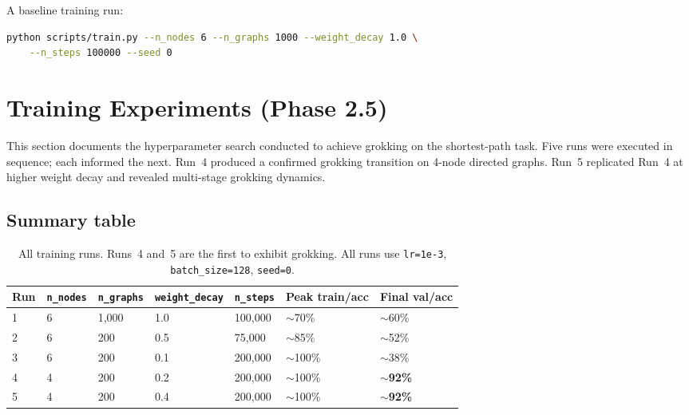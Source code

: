 \documentclass[11pt, a4paper]{article}
\begin{document}
A baseline training run:
\begin{lstlisting}[language=bash, keywordstyle={}]
python scripts/train.py --n_nodes 6 --n_graphs 1000 --weight_decay 1.0 \
    --n_steps 100000 --seed 0
\end{lstlisting}

\section{Training Experiments (Phase 2.5)}
\label{sec:experiments}

This section documents the hyperparameter search conducted to achieve grokking
on the shortest-path task. Five runs were executed in sequence; each informed
the next. Run~4 produced a confirmed grokking transition on 4-node directed
graphs. Run~5 replicated Run~4 at higher weight decay and revealed multi-stage
grokking dynamics.

\subsection{Summary table}

\begin{table}[H]
\centering
\begin{tabular}{@{}lllllll@{}}
\toprule
Run & \texttt{n\_nodes} & \texttt{n\_graphs} & \texttt{weight\_decay} & \texttt{n\_steps}
    & Peak train/acc & Final val/acc \\
\midrule
1 & 6 & 1{,}000 & 1.0  & 100{,}000 & $\sim$70\%  & $\sim$60\% \\
2 & 6 & 200     & 0.5  & 75{,}000  & $\sim$85\%  & $\sim$52\% \\
3 & 6 & 200     & 0.1  & 200{,}000 & $\sim$100\% & $\sim$38\% \\
4 & 4 & 200     & 0.2  & 200{,}000 & $\sim$100\% & $\sim$\textbf{92\%} \\
5 & 4 & 200     & 0.4  & 200{,}000 & $\sim$100\% & $\sim$\textbf{92\%} \\
\bottomrule
\end{tabular}
\caption{All training runs. Runs~4 and~5 are the first to exhibit grokking.
  All runs use \texttt{lr=1e-3}, \texttt{batch\_size=128}, \texttt{seed=0}.}
\end{table}

\end{document}
